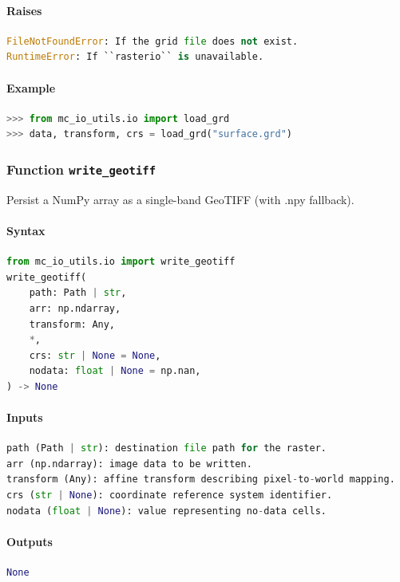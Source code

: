 \documentclass[11pt]{article}
\begin{document}
\paragraph{Raises}
\begin{lstlisting}[language=Python]
FileNotFoundError: If the grid file does not exist.
RuntimeError: If ``rasterio`` is unavailable.
\end{lstlisting}
\paragraph{Example}
\begin{lstlisting}[language=Python]
>>> from mc_io_utils.io import load_grd
>>> data, transform, crs = load_grd("surface.grd")
\end{lstlisting}

\subsubsection{Function \texttt{write\_geotiff}}
Persist a NumPy array as a single-band GeoTIFF (with .npy fallback).

\paragraph{Syntax}
\begin{lstlisting}[language=Python]
from mc_io_utils.io import write_geotiff
write_geotiff(
    path: Path | str,
    arr: np.ndarray,
    transform: Any,
    *,
    crs: str | None = None,
    nodata: float | None = np.nan,
) -> None
\end{lstlisting}
\paragraph{Inputs}
\begin{lstlisting}[language=Python]
path (Path | str): destination file path for the raster.
arr (np.ndarray): image data to be written.
transform (Any): affine transform describing pixel-to-world mapping.
crs (str | None): coordinate reference system identifier.
nodata (float | None): value representing no-data cells.
\end{lstlisting}
\paragraph{Outputs}
\begin{lstlisting}[language=Python]
None
\end{lstlisting}
\end{document}
